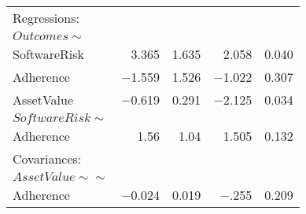 \begin{table}
\begin{center}
\begin{tabular}{l|rrrr}
			Regressions:  & & & & \\  
			$Outcomes \sim$         & & & & \\                                     
			SoftwareRisk   &  3.365 &   1.635 & 2.058 &   0.040 \\
			Adherence       &  $-$1.559  & 1.526  &  $-$1.022  &  0.307\\
			AssetValue     &   $-0$.619  &  0.291  &  $-$2.125 &   0.034\\
			$SoftwareRisk \sim$        & & & & \\                                  
			Adherence     &    1.56 &   1.04  &  1.505 &   0.132\\
			Covariances:  & & & & \\  
			$AssetValue \sim\sim$          & & & & \\                                 
			Adherence     &    $-$0.024 &   0.019  &  $-$.255 &   0.209\\
		\end{tabular}
	\end{center}
\end{table}


